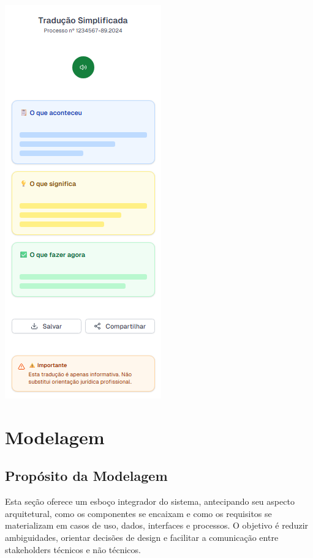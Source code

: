 \documentclass{article}
\begin{document}
\includegraphics{images/488854473-c9885c0e-2982-4055-8b41-44baeb4fe4d0.png}


\section{Modelagem}
\subsection{Propósito da Modelagem}
Esta seção oferece um esboço integrador do sistema, antecipando seu aspecto arquitetural, como os componentes se encaixam e como os requisitos se materializam em casos de uso, dados, interfaces e processos. O objetivo é reduzir ambiguidades, orientar decisões de design e facilitar a comunicação entre stakeholders técnicos e não técnicos.
\end{document}
